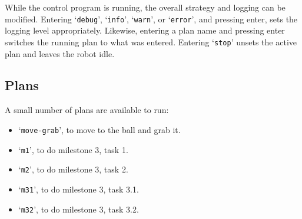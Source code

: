 \documentclass[a4paper]{scrartcl}
\begin{document}
While the control program is running, the overall strategy and logging can be
modified. Entering `\texttt{debug}', `\texttt{info}', `\texttt{warn}', or
`\texttt{error}', and pressing enter, sets the logging level appropriately.
Likewise, entering a plan name and pressing enter switches the running plan to
what was entered. Entering `\texttt{stop}' unsets the active plan and leaves
the robot idle.

\pagebreak

\subsection{Plans}

A small number of plans are available to run:

\begin{itemize}
    \item `\texttt{move-grab}', to move to the ball and grab it.
    \item `\texttt{m1}', to do milestone 3, task 1.
    \item `\texttt{m2}', to do milestone 3, task 2.
    \item `\texttt{m31}', to do milestone 3, task 3.1.
    \item `\texttt{m32}', to do milestone 3, task 3.2.
\end{itemize}
\end{document}
